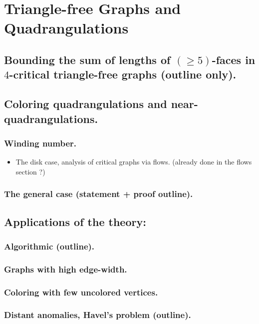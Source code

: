 \documentclass[12pt,twoside,openright,a4paper]{book}
\begin{document}
\chapter{Triangle-free Graphs and Quadrangulations}


\section{Bounding the sum of lengths of $(\ge\!5)$-faces in $4$-critical triangle-free graphs (outline only).}
\section{Coloring quadrangulations and near-quadrangulations.}

\subsection{ Winding number.}
\begin{itemize}
\item The disk case, analysis of critical graphs via flows. (already done in the flows section ?)
\end{itemize}

\subsection{The general case (statement + proof outline).}

\section{Applications of the theory:}
\subsection{Algorithmic (outline).}
\subsection{Graphs with high edge-width.}
\subsection{Coloring with few uncolored vertices.}
\subsection{Distant anomalies, Havel's problem (outline).}
\end{document}
